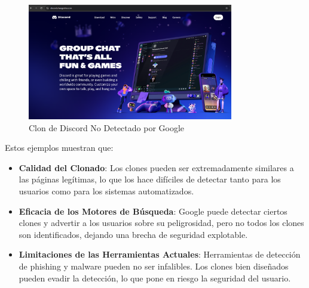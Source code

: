 \begin{figure}[H]
    \centering
    \includegraphics[width=0.8\textwidth]{discordFalso2.png}
    \caption{Clon de Discord No Detectado por Google}
    \label{fig:no-google-detect-clone}
\end{figure}

Estos ejemplos muestran que:

\begin{itemize}
    \item \textbf{Calidad del Clonado}: Los clones pueden ser extremadamente similares a las páginas legítimas, lo que los hace difíciles de detectar tanto para los usuarios como para los sistemas automatizados.
    \item \textbf{Eficacia de los Motores de Búsqueda}: Google puede detectar ciertos clones y advertir a los usuarios sobre su peligrosidad, pero no todos los clones son identificados, dejando una brecha de seguridad explotable.
    \item \textbf{Limitaciones de las Herramientas Actuales}: Herramientas de detección de phishing y malware pueden no ser infalibles. Los clones bien diseñados pueden evadir la detección, lo que pone en riesgo la seguridad del usuario.
\end{itemize}